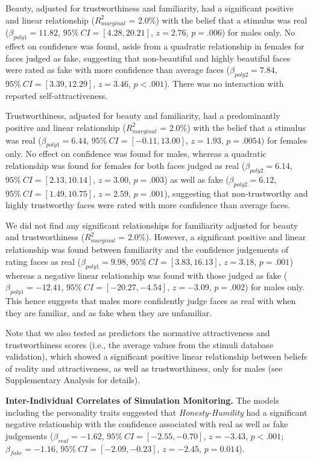 \documentclass[
  man,
  floatsintext,
  longtable,
  nolmodern,
  notxfonts,
  notimes,
  colorlinks=true,linkcolor=blue,citecolor=blue,urlcolor=blue]{apa7}
\begin{document}
Beauty, adjusted for trustworthiness and familiarity, had a significant
positive and linear relationship (\(R^2_{marginal}\) = 2.0\%) with the
belief that a stimulus was real (\(\beta_{poly1} = 11.82\),
\(95\%~CI = [4.28, 20.21]\), \(z = 2.76\), \(p = .006\)) for males only.
No effect on confidence was found, aside from a quadratic relationship
in females for faces judged as fake, suggesting that non-beautiful and
highly beautiful faces were rated as fake with more confidence than
average faces (\(\beta_{poly2} = 7.84\), \(95\%~CI = [3.39, 12.29]\),
\(z = 3.46\), \(p < .001\)). There was no interaction with reported
self-attractiveness.

Trustworthiness, adjusted for beauty and familiarity, had a
predominantly positive and linear relationship (\(R^2_{marginal}\) =
2.0\%) with the belief that a stimulus was real
(\(\beta_{poly1} = 6.44\), \(95\%~CI = [-0.11, 13.00]\), \(z = 1.93\),
\(p = .0054\)) for females only. No effect on confidence was found for
males, whereas a quadratic relationship was found for females for both
faces judged as real (\(\beta_{poly2} = 6.14\),
\(95\%~CI = [2.13, 10.14]\), \(z = 3.00\), \(p = .003\)) as well as fake
(\(\beta_{poly2} =6.12\), \(95\%~CI = [1.49, 10.75]\), \(z = 2.59\),
\(p = .001\)), suggesting that non-trustworthy and highly trustworthy
faces were rated with more confidence than average faces.

We did not find any significant relationships for familiarity adjusted
for beauty and trustworthiness (\(R^2_{marginal}\) = 2.0\%). However, a
significant positive and linear relationship was found between
familiarity and the confidence judgements of rating faces as real
(\(\beta_{poly1} = 9.98\), \(95\%~CI = [3.83, 16.13]\), \(z = 3.18\),
\(p = .001\)) whereas a negative linear relationship was found with
those judged as fake (\(\beta_{poly1} = -12.41\),
\(95\%~CI = [-20.27, -4.54]\), \(z = -3.09\), \(p = .002\)) for males
only. This hence suggests that males more confidently judge faces as
real with when they are familiar, and as fake when they are unfamiliar.

Note that we also tested as predictors the normative attractiveness and
trustworthiness scores (i.e., the average values from the stimuli
database validation), which showed a significant positive linear
relationship between beliefs of reality and attractiveness, as well as
trustworthiness, only for males (see Supplementary Analysis for
details).

\textbf{Inter-Individual Correlates of Simulation Monitoring.} The
models including the personality traits suggested that
\emph{Honesty-Humility} had a significant negative relationship with the
confidence associated with real as well as fake judgements
(\(\beta_{real} = -1.62\), \(95\%~CI = [-2.55, -0.70]\), \(z = -3.43\),
\(p < .001\); \(\beta_{fake} = -1.16\), \(95\%~CI = [-2.09, -0.23]\),
\(z = -2.45\), \(p = 0.014\)).
\end{document}
